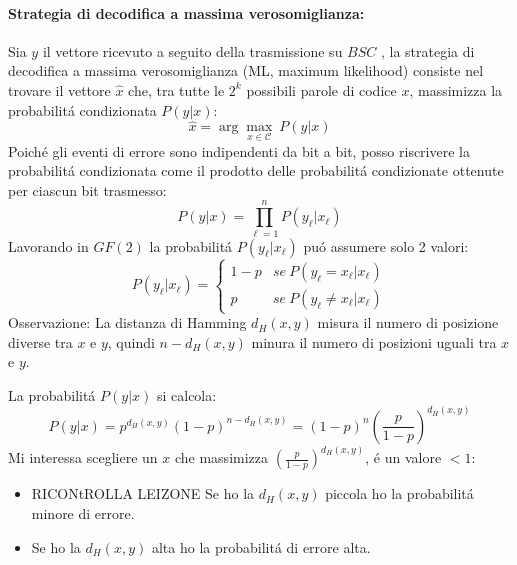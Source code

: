             \paragraph{Strategia di decodifica a massima verosomiglianza:}
                Sia $y$ il vettore ricevuto a seguito della trasmissione su $BSC$ , la strategia di decodifica a massima verosomiglianza (ML, maximum likelihood) 
                consiste nel trovare il vettore $\hat{x}$ che, tra tutte le $2^k$ possibili parole di codice $x$, massimizza la probabilitá condizionata 
                $P(y|x)$:
                \[
                    \hat{x} = \arg \underset{x\in\mathcal{C}}{\max}\ P(y|x)
                \]
                Poiché gli eventi di errore sono indipendenti da bit a bit, posso riscrivere la probabilitá condizionata come il prodotto delle probabilitá condizionate
                ottenute per ciascun bit trasmesso:
                \[
                    P(y|x) = \prod_{\ell=1}^{n} P(y_\ell|x_\ell)
                \]
                Lavorando in $GF(2)$ la probabilitá $P(y_\ell|x_\ell)$ puó assumere solo 2 valori:
                \[
                    P(y_\ell|x_\ell) = 
                    \begin{cases}
                        1-p &se\ P(y_\ell =x_\ell|x_\ell)\nonumber \\    
                        p   &se\ P(y_\ell \neq x_\ell|x_\ell)\nonumber     
                    \end{cases}
                \] 
                Osservazione: La distanza di Hamming $d_H(x,y)$ misura il numero di posizione diverse tra $x$ e $y$, quindi $n-d_H(x,y)$ minura il numero di posizioni
                uguali tra $x$ e $y$.

                La probabilitá $P(y|x)$ si calcola:
                \[
                    P(y|x) = p^{d_H(x,y)}(1-p)^{n-d_H(x,y)} =(1-p)^{n}\left(\frac{p}{1-p}\right)^{d_H(x,y)} 
                \]
                Mi interessa scegliere un $x$ che massimizza $\left(\frac{p}{1-p}\right)^{d_H(x,y)}$, é un valore $<1$:
                \begin{itemize}
                    \item {
                        RICONtROLLA LEIZONE
                        Se ho la $d_H(x,y)$ piccola ho la probabilitá minore di errore.
                    }
                    \item {
                        Se ho la $d_H(x,y)$ alta ho la probabilitá di errore alta.
                    }
                \end{itemize}
                
